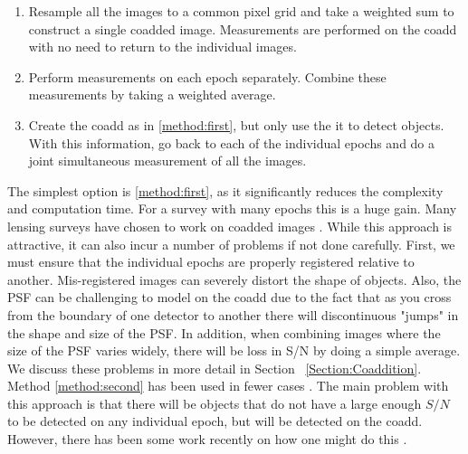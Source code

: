 \documentclass[fleqn,useAMS,usenatbib]{mnras}
\begin{document}
\begin{enumerate}
\item \label{method:first} Resample all the images to a common pixel grid and 
take a weighted sum to construct a single coadded image.  Measurements are 
performed on the coadd with no need to return to the individual images.
\item \label{method:second} Perform measurements on each epoch separately.  
Combine these measurements by taking a weighted average.  
\item \label{method:third} Create the coadd as in \ref{method:first}, but only 
use the it to detect objects.  With this information, go back to each of the 
individual epochs and do a joint simultaneous measurement of all the images.
\end{enumerate}

The simplest option is \ref{method:first}, as it significantly reduces the 
complexity and computation time.  For a survey with many epochs this is a huge 
gain.  Many lensing surveys have chosen to work on coadded images 
\citep{Hoekstra2006, Leauthaud2007, Hettersheidt2007, Lin2012,Melchior2015, 
Jee2016, Mandelbaum2018}.  While this approach is attractive, it can also incur 
a number of problems if not done carefully.  First, we must ensure that the 
individual epochs are properly registered relative to another.  Mis-registered 
images can severely distort the shape of objects. Also, the PSF can be 
challenging to model on the coadd due to the fact that as you cross from the 
boundary of one detector to another there will discontinuous "jumps" in the 
shape and size of the PSF.  In addition, when combining images where the size 
of the PSF varies widely, there will be loss in S/N by doing a simple average.  
We discuss these problems in more detail in Section ~\ref{Section:Coaddition}.
Method \ref{method:second} has been used in fewer cases \citep{Jarvis2003}.  
The main problem with this approach is that there will be objects that do not 
have a large enough $S/N$ to be detected on any individual epoch, but will be 
detected on the coadd.  However, there has been some work recently on how one 
might do this \citep{Budavari2017}.
\end{document}
